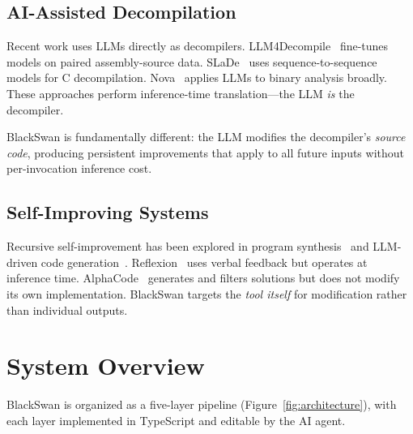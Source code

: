 \documentclass[conference,11pt]{IEEEtran}
\begin{document}
\subsection{AI-Assisted Decompilation}

Recent work uses LLMs directly as decompilers. LLM4Decompile~\cite{llm4decompile} fine-tunes models on paired assembly-source data. SLaDe~\cite{slade} uses sequence-to-sequence models for C decompilation. Nova~\cite{nova} applies LLMs to binary analysis broadly. These approaches perform inference-time translation---the LLM \emph{is} the decompiler.

BlackSwan is fundamentally different: the LLM modifies the decompiler's \emph{source code}, producing persistent improvements that apply to all future inputs without per-invocation inference cost.

\subsection{Self-Improving Systems}

Recursive self-improvement has been explored in program synthesis~\cite{levin2013, schmidhuber2003} and LLM-driven code generation~\cite{chen2024selfplay, shinn2023reflexion}. Reflexion~\cite{shinn2023reflexion} uses verbal feedback but operates at inference time. AlphaCode~\cite{alphacode} generates and filters solutions but does not modify its own implementation. BlackSwan targets the \emph{tool itself} for modification rather than individual outputs.

\section{System Overview}
\label{sec:system}

BlackSwan is organized as a five-layer pipeline (Figure~\ref{fig:architecture}), with each layer implemented in TypeScript and editable by the AI agent.
\end{document}
